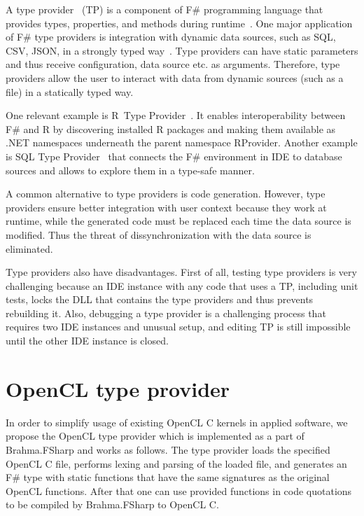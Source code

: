 \documentclass[sigplan,review]{acmart}\settopmatter{printfolios=true}
\begin{document}
A type provider~\cite{syme2012strongly} (TP) is a component of F\# programming language that provides types, properties, and methods during runtime~\cite{TypeProviders}. One major application of F\# type providers is integration with dynamic data sources, such as SQL, CSV, JSON, in a strongly typed way~\cite{FSharpData}. Type providers can have static parameters and thus receive configuration, data source etc. as arguments. Therefore, type providers allow the user to interact with data from dynamic sources (such as a file) in a statically typed way.

One relevant example is R~Type Provider~\cite{R_TP}. It enables interoperability between F\# and R by discovering installed R packages and making them available as .NET namespaces underneath the parent namespace RProvider. Another example is SQL Type Provider~\cite{SQL_TP} that connects the F\# environment in IDE to database sources and allows to explore them in a type-safe manner.

A common alternative to type providers is code generation. However, type providers ensure better integration with user context because they work at runtime, while the generated code must be replaced each time the data source is modified. Thus the threat of dissynchronization with the data source is eliminated.

Type providers also have disadvantages. First of all, testing type providers is very challenging because an IDE instance with any code that uses a TP, including unit tests, locks the DLL that contains the type providers and thus prevents rebuilding it. Also, debugging a type provider is a challenging process that requires two IDE instances and unusual setup, and editing TP is still impossible until the other IDE instance is closed.

\section{OpenCL type provider}

In order to simplify usage of existing OpenCL C kernels in applied software, we propose the OpenCL type provider which is implemented as a part of Brahma.FSharp and works as follows. 
The type provider loads the specified OpenCL C file, performs lexing and parsing of the loaded file, and generates an F\# type with static functions that have the same signatures as the original OpenCL functions.
After that one can use provided functions in code quotations to be compiled by Brahma.FSharp to OpenCL C.
\end{document}
